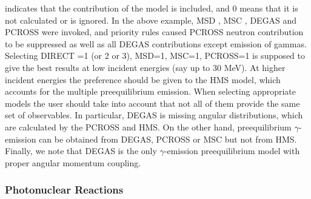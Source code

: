  indicates that the contribution of the model is included, and 0
means that it is not calculated or is ignored. In the above example, MSD%
, MSC%
, DEGAS%
 and PCROSS%
 were invoked, and priority rules caused PCROSS neutron
contribution to be suppressed as well as all DEGAS contributions except
emission of gammas. Selecting DIRECT =1 (or 2 or 3), MSD=1, MSC=1, PCROSS=1
is supposed to give the best results at low incident energies (say up to 30
MeV). At higher incident energies the preference should be given to the HMS%
 model, which accounts for the multiple preequilibrium emission.
When selecting appropriate models the user should take into account that not
all of them provide the same set of observables. In particular, DEGAS%
 is missing angular distributions, which are calculated by the
PCROSS and HMS. On the other hand, preequilibrium $\gamma$-emission can be
obtained from DEGAS, PCROSS or MSC but not from HMS. Finally, we note that
DEGAS is the only $\gamma$-emission preequilibrium model with proper angular
momentum coupling.

\subsubsection{\label{sec:photonuclear} Photonuclear Reactions}

